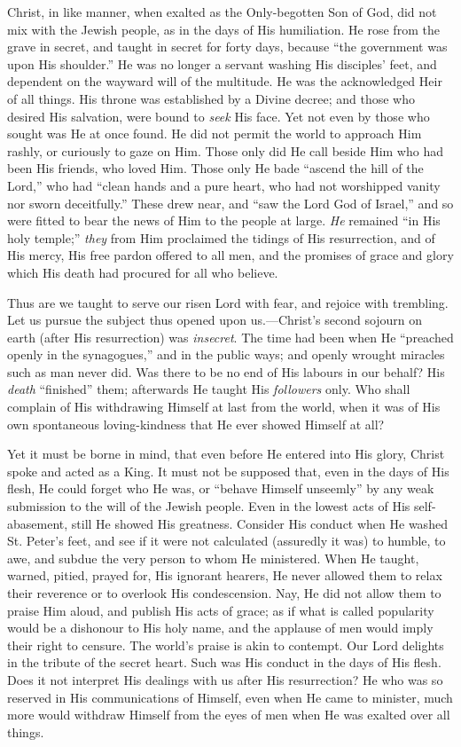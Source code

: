 Christ, in like manner, when exalted as the
Only-begotten Son of God, did not mix with the Jewish
people, as in the days of His humiliation. He rose from
the grave in secret, and taught in secret for forty days,
because ``the government was upon His shoulder.''
He was no longer a servant washing His disciples' feet,
and dependent on the wayward will of the multitude. He
was the acknowledged Heir of all things. His throne was
established by a Divine decree; and those who desired His
salvation, were bound to \emph{seek} His face. Yet not
even by those who sought was He at once found. He did not
permit the world to approach Him rashly, or curiously to
gaze on Him. Those only did He call beside Him who had
been His friends, who loved Him. Those only He bade
``ascend the hill of the Lord,'' who had
``clean hands and a pure heart, who had not
worshipped vanity nor sworn deceitfully.'' These drew
near, and ``saw the Lord God of Israel,'' and so
were fitted to bear the news of Him to the people at
large. \emph{He} remained ``in His holy temple;''
\emph{they} from Him proclaimed the tidings of His
resurrection, and of His mercy, His free pardon offered
to all men, and the promises of grace and glory which His
death had procured for all who believe.

Thus are we taught to serve our risen Lord with fear,
and rejoice with trembling. Let us pursue the subject
thus opened upon us.—Christ's second sojourn on
earth (after His resurrection) was \emph{in}\emph{secret}.
The time had been when He ``preached openly in the
synagogues,'' and in the public ways; and openly
wrought miracles such as man never did. Was there to be
no end of His labours in our behalf? His \emph{death}
``finished'' them; afterwards He taught His \emph{followers}
only. Who shall complain of His withdrawing Himself at
last from the world, when it was of His own spontaneous
loving-kindness that He ever showed Himself at all?

Yet it must be borne in mind, that even before He
entered into His glory, Christ spoke and acted as a King.
It must not be supposed that, even in the days of His
flesh, He could forget who He was, or ``behave
Himself unseemly'' by any weak submission to the will
of the Jewish people. Even in the lowest acts of His
self-abasement, still He showed His greatness. Consider
His conduct when He washed St. Peter's feet, and see if
it were not calculated (assuredly it was) to humble, to
awe, and subdue the very person to whom He ministered.
When He taught, warned, pitied, prayed for, His ignorant
hearers, He never allowed them to relax their reverence
or to overlook His condescension. Nay, He did not allow
them to praise Him aloud, and publish His acts of grace;
as if what is called popularity would be a dishonour to
His holy name, and the applause of men would imply their
right to censure. The world's praise is akin to contempt.
Our Lord delights in the tribute of the secret heart.
Such was His conduct in the days of His flesh. Does it
not interpret His dealings with us after His
resurrection? He who was so reserved in His
communications of Himself, even when He came to minister,
much more would withdraw Himself from the eyes of men
when He was exalted over all things.

